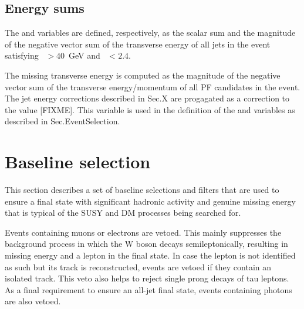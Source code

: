 \subsection*{Energy sums}

The \scalht and \MHT variables are defined, respectively, as the scalar sum and 
the magnitude of the negative vector sum of the transverse energy of all jets 
in the event satisfying \pt~$>40$~GeV and \etaabs~$<2.4$.

The missing transverse energy \met is computed as the magnitude of the negative 
vector sum of the transverse energy/momentum of all PF candidates in the event. 
The jet energy corrections described in Sec.X are progagated as a correction to 
the \met value [FIXME]. This variable is used in the definition of the \mt and 
\mhtmet variables as described in Sec.EventSelection.



\section{Baseline selection}

This section describes a set of baseline selections and filters that are used 
to ensure a final state with significant hadronic activity and genuine missing 
energy that is typical of the SUSY and DM processes being searched for.

Events containing muons or electrons are vetoed. This mainly suppresses the 
\Wjets background process in which the W boson decays semileptonically, 
resulting in missing energy and a lepton in the final state. In case the lepton 
is not identified as such but its track is reconstructed, events are vetoed if 
they contain an isolated track. This veto also helps to reject single prong 
decays of tau leptons. %
As a final requirement to ensure an all-jet final state, events containing 
photons are also vetoed.


